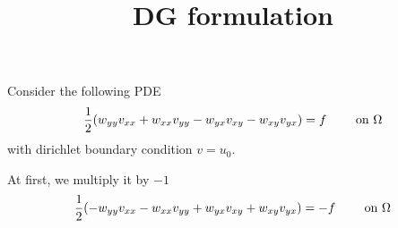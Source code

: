 \documentclass[a4paper,11pt]{article}
\title{DG formulation}
\newcommand{\myint}{\displaystyle\int}
\begin{document}
\maketitle

Consider the following PDE 
\begin{equation}
	\frac 1 2 (w_{yy} v_{xx}+w_{xx} v_{yy} - w_{yx} v_{xy} - w_{xy} v_{yx}) = f \qquad \textnormal{ on } \Omega \label{PDE}		
\end{equation}
with dirichlet boundary condition $v = u_0$.

At first, we multiply it by $-1$
\begin{equation}
	\frac 1 2 (-w_{yy} v_{xx}-w_{xx} v_{yy} + w_{yx} v_{xy} + w_{xy} v_{yx}) = -f \qquad \textnormal{ on } \Omega \label{PDE}		
\end{equation}

\end{document}
